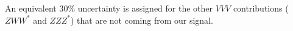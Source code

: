 An equivalent $30\%$ uncertainty is assigned for the other $VVV$ contributions ($ZWW^{*}$ and $ZZZ^{*}$) that are not coming from our signal.

